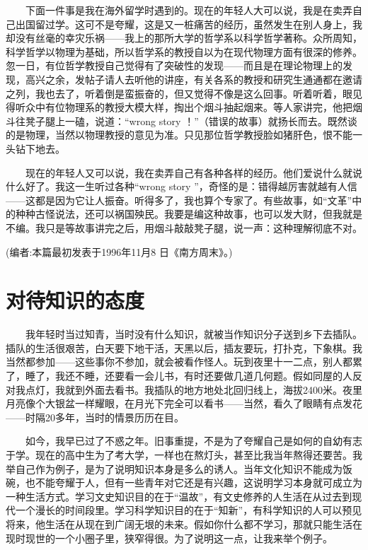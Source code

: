 　　下面一件事是我在海外留学时遇到的。现在的年轻人大可以说，我是在卖弄自己出国留过学。这可不是夸耀，这是又一桩痛苦的经历，虽然发生在别人身上，我却没有丝毫的幸灾乐祸——我上的那所大学的哲学系以科学哲学著称。众所周知，科学哲学以物理为基础，所以哲学系的教授自以为在现代物理方面有很深的修养。忽一日，有位哲学教授自己觉得有了突破性的发现——而且是在理论物理上的发现，高兴之余，发帖子请人去听他的讲座，有关各系的教授和研究生通通都在邀请之列，我也去了，听着倒是蛮振奋的，但又觉得不像是这么回事。听着听着，眼见得听众中有位物理系的教授大模大样，掏出个烟斗抽起烟来。等人家讲完，他把烟斗往凳子腿上一磕，说道：“wrong story ！”（错误的故事）就扬长而去。既然谈的是物理，当然以物理教授的意见为准。只见那位哲学教授脸如猪肝色，恨不能一头钻下地去。 

　　现在的年轻人又可以说，我在卖弄自己有各种各样的经历。他们爱说什么就说什么好了。我这一生听过各种“wrong story ”，奇怪的是：错得越厉害就越有人信——这都是因为它让人振奋。听得多了，我也算个专家了。有些故事，如“文革”中的种种古怪说法，还可以祸国殃民。我要是编这种故事，也可以发大财，但我就是不编。我只是等故事讲完之后，用烟斗敲敲凳子腿，说一声：这种理解彻底不对。 


(编者:本篇最初发表于1996年11月8 日《南方周末》。)

\chapter{对待知识的态度}

　　我年轻时当过知青，当时没有什么知识，就被当作知识分子送到乡下去插队。插队的生活很艰苦，白天要下地干活，天黑以后，插友要玩，打扑克，下象棋。我当然都参加——这些事你不参加，就会被看作怪人。玩到夜里十一二点，别人都累了，睡了，我还不睡，还要看一会儿书，有时还要做几道几何题。假如同屋的人反对我点灯，我就到外面去看书。我插队的地方地处北回归线上，海拔2400米。夜里月亮像个大银盆一样耀眼，在月光下完全可以看书——当然，看久了眼睛有点发花——时隔20多年，当时的情景历历在目。 

　　如今，我早已过了不惑之年。旧事重提，不是为了夸耀自己是如何的自幼有志于学。现在的高中生为了考大学，一样也在熬灯头，甚至比我当年熬得还要苦。我举自己作为例子，是为了说明知识本身是多么的诱人。当年文化知识不能成为饭碗，也不能夸耀于人，但有一些青年对它还是有兴趣，这说明学习本身就可成立为一种生活方式。学习文史知识目的在于“温故”，有文史修养的人生活在从过去到现代一个漫长的时间段里。学习科学知识目的在于“知新”，有科学知识的人可以预见将来，他生活在从现在到广阔无垠的未来。假如你什么都不学习，那就只能生活在现时现世的一个小圈子里，狭窄得很。为了说明这一点，让我来举个例子。 

